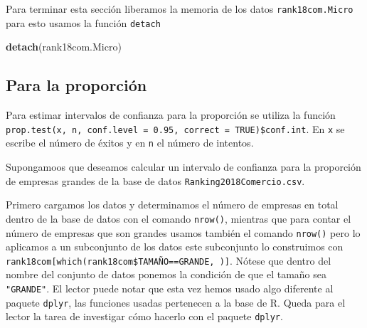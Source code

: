 \documentclass[letterpaper,]{book}
\newenvironment{Shaded}{\begin{snugshade}}{\end{snugshade}}
\newcommand{\CommentTok}[1]{\textcolor[rgb]{0.56,0.35,0.01}{\textit{#1}}}
\newcommand{\DataTypeTok}[1]{\textcolor[rgb]{0.13,0.29,0.53}{#1}}
\newcommand{\FloatTok}[1]{\textcolor[rgb]{0.00,0.00,0.81}{#1}}
\newcommand{\KeywordTok}[1]{\textcolor[rgb]{0.13,0.29,0.53}{\textbf{#1}}}
\newcommand{\NormalTok}[1]{#1}
\newcommand{\OperatorTok}[1]{\textcolor[rgb]{0.81,0.36,0.00}{\textbf{#1}}}
\begin{document}
\begin{Shaded}
\end{Shaded}

Para terminar esta sección liberamos la memoria de los datos \texttt{rank18com.Micro} para esto usamos la función \texttt{detach}

\begin{Shaded}
\begin{Highlighting}[]
\KeywordTok{detach}\NormalTok{(rank18com.Micro)}
\end{Highlighting}
\end{Shaded}

\hypertarget{para-la-proporcion}{%
\subsection{Para la proporción}\label{para-la-proporcion}}

Para estimar intervalos de confianza para la proporción se utiliza la función \texttt{prop.test(x,\ n,\ conf.level\ =\ 0.95,\ correct\ =\ TRUE)\$conf.int}. En \texttt{x} se escribe el número de éxitos y en \texttt{n} el número de intentos.

Supongamoos que deseamos calcular un intervalo de confianza para la proporción de empresas grandes de la base de datos \texttt{Ranking2018Comercio.csv}.

Primero cargamos los datos y determinamos el número de empresas en total dentro de la base de datos con el comando \texttt{nrow()}, mientras que para contar el número de empresas que son grandes usamos también el comando \texttt{nrow()} pero lo aplicamos a un subconjunto de los datos este subconjunto lo construimos con \texttt{rank18com{[}which(rank18com\$TAMAÑO==\textquotesingle{}GRANDE\textquotesingle{},\ ){]}}. Nótese que dentro del nombre del conjunto de datos ponemos la condición de que el tamaño sea \texttt{"GRANDE"}. El lector puede notar que esta vez hemos usado algo diferente al paquete \texttt{dplyr}, las funciones usadas pertenecen a la base de R. Queda para el lector la tarea de investigar cómo hacerlo con el paquete \texttt{dplyr}.
\end{document}
